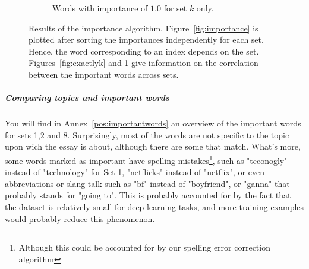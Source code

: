 \documentclass[a4paper,12pt,english]{article}
\begin{document}
\begin{figure}
\begin{subfigure}{.5\textwidth}
		\caption{Words with importance of $1.0$ for set $k$ only.}
		\label{fig:onlyk}
	\end{subfigure}
	\caption{Results of the importance algorithm. Figure~\ref{fig:importance} is plotted after sorting the importances independently for each set. Hence, the word corresponding to an index depends on the set. Figures~\ref{fig:exactlyk} and \ref{fig:onlyk} give information on the correlation between the important words across sets.}
	\label{fig:onewordessays}
\end{figure}

\subparagraph{Comparing topics and important words} You will find in Annex~\ref{pos:importantwords} an overview of the important words for sets 1,2 and 8. Surprisingly, most of the words are not specific to the topic upon wich the essay is about, although there are some that match. What's more, some words marked as important have spelling mistakes\footnote{Although this could be accounted for by our spelling error correction algorithm}, such as "teconogly" instead of "technology" for Set 1, "netflicks" instead of "netflix", or even abbreviations or slang talk such as "bf" instead of "boyfriend", or "ganna" that probably stands for "going to". This is probably accounted for by the fact that the dataset is relatively small for deep learning tasks, and more training examples would probably reduce this phenomenon.
\end{document}
